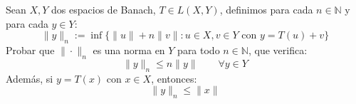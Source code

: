 \begin{ejercicio}\label{ej:norman}
    Sean $X,Y$ dos espacios de Banach, $T\in L(X,Y)$, definimos para cada $n\in \mathbb{N}$ y para cada $y \in Y$:
    \begin{equation*}
        \|y\|_n := \inf\{\|u\| + n\|v\| : u\in X, v\in Y \text{\ con\ } y = T(u)+v\}
    \end{equation*}
    Probar que $\|\cdot \|_n$ es una norma en $Y$ para todo $n\in \mathbb{N}$, que verifica:
    \begin{equation*}
        \|y\|_n \leq n\|y\| \qquad \forall y\in Y
    \end{equation*}
    Además, si $y=T(x)$ con $x\in X$, entonces:
    \begin{equation*}
        \|y\|_n \leq \|x\|
    \end{equation*}~\\


\end{ejercicio}
